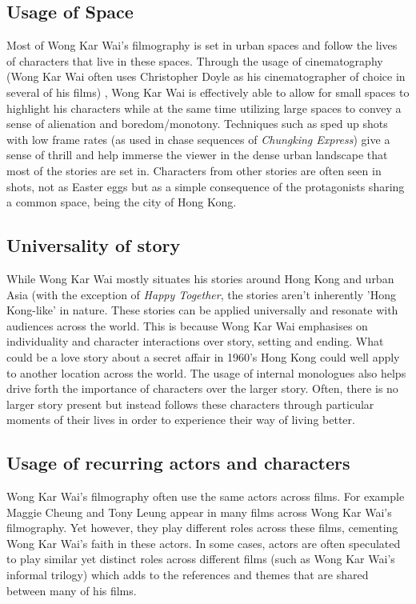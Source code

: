 \begin{multicols}{2}
\subsection{Usage of Space}
Most of Wong Kar Wai's filmography is set in urban spaces and follow the lives of characters that live in these spaces. Through the usage of cinematography (Wong Kar Wai often uses Christopher Doyle as his cinematographer of choice in several of his films) , Wong Kar Wai is effectively able to allow for small spaces to highlight his characters while at the same time utilizing large spaces to convey a sense of alienation and boredom/monotony. Techniques such as sped up shots with low frame rates (as used in chase sequences of \emph{Chungking Express}) give a sense of thrill and help immerse the viewer in the dense urban landscape that most of the stories are set in. Characters from other stories are often seen in shots, not as Easter eggs but as a simple consequence of the protagonists sharing a common space, being the city of Hong Kong.

\subsection{Universality of story}
While Wong Kar Wai mostly situates his stories around Hong Kong and urban Asia (with the exception of \emph{Happy Together}, the stories aren't inherently 'Hong Kong-like' in nature. These stories can be applied universally and resonate with audiences across the world. This is because Wong Kar Wai emphasises on individuality and character interactions over story, setting and ending. What could be a love story about a secret affair in 1960's Hong Kong could well apply to another location across the world. The usage of internal monologues also helps drive forth the importance of characters over the larger story. Often, there is no larger story present but instead follows these characters through particular moments of their lives in order to experience their way of living better.

\subsection{Usage of recurring actors and characters}
Wong Kar Wai's filmography often use the same actors across films. For example Maggie Cheung and Tony Leung appear in many films across Wong Kar Wai's filmography. Yet however, they play different roles across these films, cementing Wong Kar Wai's faith in these actors. In some cases, actors are often speculated to play similar yet distinct roles across different films (such as Wong Kar Wai's informal trilogy) which adds to the references and themes that are shared between many of his films.


\end{multicols}
